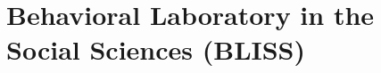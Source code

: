 \chapter{Behavioral Laboratory in the Social Sciences (BLISS)}


\begin{abstract}
{TITLE}
{NAME}
{Harvard College}
{Sociology}
{Class of 2019}
{PI}
{PI NAME}
{{\textit{Mentors}\par} \noindent
 MENTOR
}
{MENTOR}

BODY

\end{abstract}

